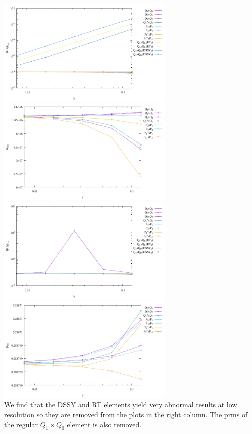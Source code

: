 \begin{center}
\includegraphics[width=8.5cm]{python_codes/fieldstone_120/results_sinker/errors-velocity-all}
\includegraphics[width=8.5cm]{python_codes/fieldstone_120/results_sinker/errors-velocity-subset}\\
\includegraphics[width=8.5cm]{python_codes/fieldstone_120/results_sinker/errors-pressure-all}
\includegraphics[width=8.5cm]{python_codes/fieldstone_120/results_sinker/errors-pressure-subset}\\
{\captionfont We find that the DSSY and RT elements yield very abnormal results at low resolution
so they are removed from the plots in the right column. The prms of the regular $Q_1\times Q_0$ element 
is also removed.}
\end{center}







